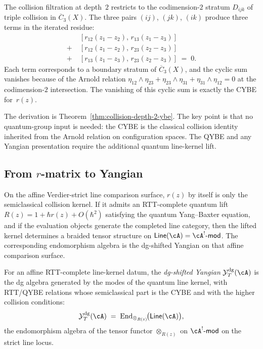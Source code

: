 The collision filtration at depth~$2$ restricts to the codimension-$2$
stratum $D_{ijk}$ of triple collision in $\overline{C}_3(X)$. The
three pairs $(ij)$, $(jk)$, $(ik)$ produce three terms in the
iterated residue:
\begin{align}
&[r_{12}(z_1 - z_2),\, r_{13}(z_1 - z_3)] \nonumber \\
+\; &[r_{12}(z_1 - z_2),\, r_{23}(z_2 - z_3)] \label{eq:thqg-intro-cybe-explicit} \\
+\; &[r_{13}(z_1 - z_3),\, r_{23}(z_2 - z_3)]
\;=\; 0. \nonumber
\end{align}
Each term corresponds to a boundary stratum of $\overline{C}_3(X)$,
and the cyclic sum vanishes because of the Arnold relation
$\eta_{12} \wedge \eta_{23} + \eta_{23} \wedge \eta_{31}
+ \eta_{31} \wedge \eta_{12} = 0$ at the codimension-$2$ intersection.
The vanishing of this cyclic sum is exactly the CYBE for~$r(z)$.

The derivation is Theorem~\ref{thm:collision-depth-2-ybe}. The key
point is that no quantum-group input is needed: the CYBE is the
classical collision identity inherited from the Arnold relation on
configuration spaces. The QYBE and any Yangian presentation require
the additional quantum line-kernel lift.

\subsection{From $r$-matrix to Yangian}
\label{subsec:thqg-intro-r-to-yangian}

On the affine Verdier-strict line comparison surface, $r(z)$ by
itself is only the semiclassical collision kernel. If it admits an
RTT-complete quantum lift
$R(z)=1+\hbar r(z)+O(\hbar^2)$ satisfying the quantum Yang--Baxter
equation, and if the evaluation objects generate the completed line
category, then the lifted kernel determines a braided tensor structure
on $\mathsf{Line}(\cA)=\cA^!\text{-}\mathsf{mod}$. The corresponding
endomorphism algebra is the dg-shifted Yangian on that affine
comparison surface.

\begin{definition}
\label{def:thqg-intro-dg-yangian}
For an affine RTT-complete line-kernel datum, the
\emph{dg-shifted Yangian} $\mathcal{Y}^{\mathrm{dg}}_T(\cA)$
is the dg algebra generated by the modes of the quantum line kernel,
with RTT/QYBE relations whose semiclassical part is the CYBE and with
the higher collision conditions:
\begin{equation}\label{eq:thqg-intro-yangian-generators}
\mathcal{Y}^{\mathrm{dg}}_T(\cA)
\;=\;
\operatorname{End}_{\otimes_{R(z)}}\!
\bigl(\mathsf{Line}(\cA)\bigr),
\end{equation}
the endomorphism algebra of the tensor functor $\otimes_{R(z)}$ on
$\cA^!\text{-}\mathsf{mod}$ on the strict line locus.
\end{definition}

